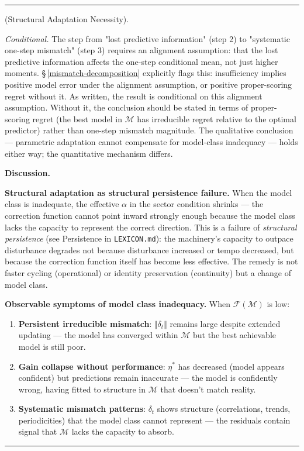 \documentclass[11pt,oneside]{article}
\newcounter{claim}[section]
\renewcommand{\theclaim}{\thesection.\arabic{claim}}
\newenvironment{segment}[2]{%
  \refstepcounter{claim}%
  \bigskip\noindent\hrule\smallskip
  \noindent{\bfseries #1~\theclaim}\enskip(#2).\par\smallskip
  \noindent\ignorespaces
}{%
  \par\smallskip\noindent\hrule\bigskip
}
\newenvironment{theorem}[1][]{\begin{segment}{Theorem}{#1}}{\end{segment}}
\begin{document}
\begin{theorem}[Structural Adaptation Necessity]
\textit{Conditional.} The step from "lost predictive information" (step 2) to "systematic one-step mismatch" (step 3) requires an alignment assumption: that the lost predictive information affects the one-step conditional mean, not just higher moments. \S\,\ref{mismatch-decomposition} explicitly flags this: insufficiency implies positive model error under the alignment assumption, or positive proper-scoring regret without it. As written, the result is conditional on this alignment assumption. Without it, the conclusion should be stated in terms of proper-scoring regret (the best model in $\mathcal{M}$ has irreducible regret relative to the optimal predictor) rather than one-step mismatch magnitude. The qualitative conclusion — parametric adaptation cannot compensate for model-class inadequacy — holds either way; the quantitative mechanism differs.


\medskip\noindent\textbf{Discussion.}


\textbf{Structural adaptation as structural persistence failure.} When the model class is inadequate, the effective $\alpha$ in the sector condition shrinks — the correction function cannot point inward strongly enough because the model class lacks the capacity to represent the correct direction. This is a failure of \textit{structural persistence} (see Persistence in \texttt{LEXICON.md}): the machinery's capacity to outpace disturbance degrades not because disturbance increased or tempo decreased, but because the correction function itself has become less effective. The remedy is not faster cycling (operational) or identity preservation (continuity) but a change of model class.

\textbf{Observable symptoms of model class inadequacy.} When $\mathcal{F}(\mathcal{M})$ is low:

\begin{enumerate}
  \item \textbf{Persistent irreducible mismatch}: $\Vert\delta_t\Vert$ remains large despite extended updating — the model has converged within $\mathcal{M}$ but the best achievable model is still poor.
  \item \textbf{Gain collapse without performance}: $\eta^*$ has decreased (model appears confident) but predictions remain inaccurate — the model is confidently wrong, having fitted to structure in $\mathcal{M}$ that doesn't match reality.
  \item \textbf{Systematic mismatch patterns}: $\delta_t$ shows structure (correlations, trends, periodicities) that the model class cannot represent — the residuals contain signal that $\mathcal{M}$ lacks the capacity to absorb.
\end{enumerate}



\end{theorem}
\end{document}
